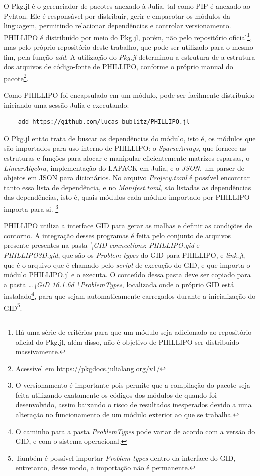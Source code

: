 O Pkg.jl é o gerenciador de pacotes anexado à Julia, tal como PIP é anexado ao Pyhton. Ele é responsável por distribuir, gerir e empacotar os módulos da linguagem, permitindo relacionar dependências e controlar versionamento. PHILLIPO é distribuído por meio do Pkg.jl, porém, não pelo repositório oficial\footnote{Há uma série de critérios para que um módulo seja adicionado ao repositório oficial do Pkg.jl, além disso, não é objetivo de PHILLIPO ser distribuido massivamente.}, mas pelo próprio repositório deste trabalho, que pode ser utilizado para o mesmo fim, pela função \emph{add}. A utilização do \emph{Pkg.jl} determinou a estrutura de a estrutura dos arquivos de código-fonte de PHILLIPO, conforme o próprio manual do pacote\footnote{Acessível em \url{https://pkgdocs.julialang.org/v1/}}.

Como PHILLIPO foi encapsulado em um módulo, pode ser facilmente distribuído iniciando uma sessão Julia e executando:
\begin{lstlisting}
    add https://github.com/lucas-bublitz/PHILLIPO.jl
\end{lstlisting}

O Pkg.jl então trata de buscar as dependências do módulo, isto é, os módulos que são importados para uso interno de PHILLIPO: o \emph{SparseArrays}, que fornece as estruturas e funções para alocar e manipular eficientemente matrizes esparsas, o \emph{LinearAlgebra}, implementação do LAPACK em Julia, e o \emph{JSON}, um parser de objetos em JSON para dicionários. No arquivo \emph{Projecy.toml} é possível encontrar tanto essa lista de dependência, e no \emph{Manifest.toml}, são listadas as dependências das dependências, isto é, quais módulos cada módulo importado por PHILLIPO importa para si. \footnote{O versionamento é importante pois permite que a compilação do pacote seja feita utilizando exatamente os códigos dos módulos de quando foi desenvolvido, assim baixando o risco de resultados inesperados devido a uma alteração no funcionamento de um módulo exterior ao que se trabalha. }

PHILLIPO utiliza a interface GID para gerar as malhas e definir as condições de contorno. A integração desses programas é feita pelo conjunto de arquivos presente presentes na pasta \emph{\textbackslash GID connections}: \emph{PHILLIPO.gid} e \emph{PHILLIPO3D.gid}, que são os \emph{Problem types} do GID para PHILLIPO, e \emph{link.jl}, que é o arquivo que é chamado pelo \emph{script} de execução do GID, e que importa o módulo PHILLIPO.jl e o executa. O conteúdo dessa pasta deve ser copiado para a pasta \emph{\dots\textbackslash GiD 16.1.6d \textbackslash ProblemTypes}, localizada onde o próprio GID está instalado\footnote{O caminho para a pasta \emph{ProblemTypes} pode variar de acordo com a versão do GID, e com o sistema operacional.}, para que sejam automaticamente carregados durante a inicialização do GID\footnote{Também é possível importar \emph{Problem types} dentro da interface do GID, entretanto, desse modo, a importação não é permanente.}.

